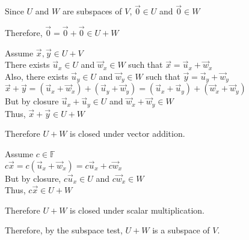 \documentclass[letterpaper,12pt,fleqn]{article}
\newcommand{\F}{\mathbb{F}}
\newcommand{\vx}{\vec{x}}
\newcommand{\vy}{\vec{y}}
\newcommand{\vu}{\vec{u}}
\newcommand{\vw}{\vec{w}}
\newcommand{\vz}{\vec{0}}
\begin{document}
\begin{theproof}
  Since $U$ and $W$ are subspaces of $V$, $\vz\in U$ and $\vz\in W$

  Therefore, $\vz=\vz+\vz\in U+W$

  Assume $\vx,\vy\in U+V$ \\
  There exists $\vu_x\in U$ and $\vw_x\in W$ such that $\vx=\vu_x+\vw_x$ \\
  Also, there exists $\vu_y\in U$ and $\vw_y\in W$ such that
  $\vy=\vu_y+\vw_y$ \\
  $\vx+\vy=(\vu_x+\vw_x)+(\vu_y+\vw_y)=(\vu_x+\vu_y)+(\vw_x+\vw_y)$ \\
  But by closure $\vu_x+\vu_y\in U$ and $\vw_x+\vw_y\in W$ \\
  Thus, $\vx+\vy\in U+W$

  Therefore $U+W$ is closed under vector addition.

  Assume $c\in\F$ \\
  $c\vx=c(\vu_x+\vw_x)=c\vu_x+c\vw_x$ \\
  But by closure, $c\vu_x\in U$ and $c\vw_x\in W$ \\
  Thus, $c\vx\in U+W$

  Therefore $U+W$ is closed under scalar multiplication.

  Therefore, by the subspace test, $U+W$ is a subspace of $V$.
\end{theproof}
\end{document}
